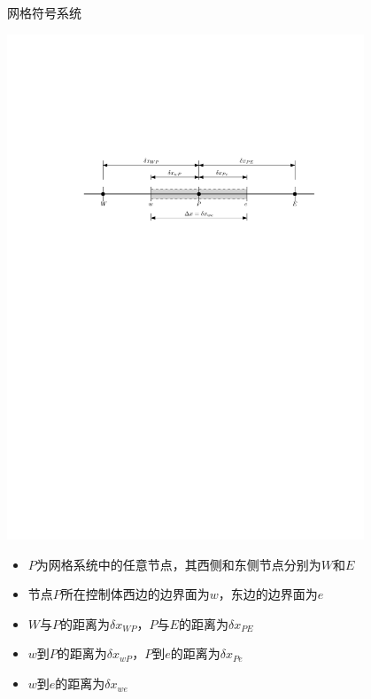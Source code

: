 \begin{frame}{网格符号系统}
\begin{center}
  \includegraphics[width=0.8\textwidth]{FVmGridNotation.pdf}
\end{center}
  
\begin{itemize}
  \item $P$为网格系统中的任意节点，其西侧和东侧节点分别为$W$和$E$
  \item 节点$P$所在控制体西边的边界面为$w$，东边的边界面为$e$
  \item $W$与$P$的距离为$\delta x_{WP}$，$P$与$E$的距离为$\delta x_{PE}$
  \item $w$到$P$的距离为$\delta x_{wP}$，$P$到$e$的距离为$\delta x_{Pe}$
  \item $w$到$e$的距离为$\delta x_{we}$
\end{itemize}
\end{frame}

